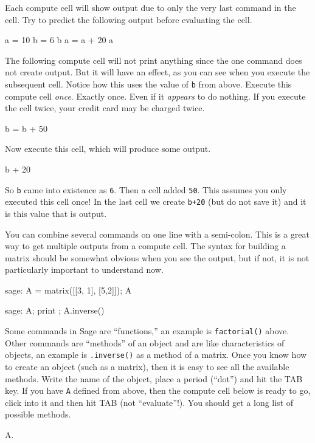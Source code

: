 %
Each compute cell will show output due to only the very last command in the cell.  Try to predict the following output before evaluating the cell.
%
\begin{sageverbatim}
a = 10
b = 6
b
a = a + 20
a
\end{sageverbatim}
%
The following compute cell will not print anything since the one command does not create output.  But it will have an effect, as you can see when you execute the subsequent cell.  Notice how this uses the value of \verb?b? from above.  Execute this compute cell \emph{once}.  Exactly once.  Even if it \emph{appears} to do nothing.  If you execute the cell twice, your credit card may be charged twice.
%
\begin{sageverbatim}
b = b + 50
\end{sageverbatim}
%
Now execute this cell, which will produce some output.
%
\begin{sageverbatim}
b + 20
\end{sageverbatim}
%
So \verb?b? came into existence as \verb?6?.  Then a cell added \verb?50?.  This assumes you only executed this cell once!  In the last cell we create \verb?b+20? (but do not save it) and it is this value that is output.\par
%
You can combine several commands on one line with a semi-colon.  This is a great way to get multiple outputs from a compute cell.  The syntax for building a matrix should be somewhat obvious when you see the output, but if not, it is not particularly important to understand now.
%
\begin{sageverbatim}
sage: A = matrix([[3, 1], [5,2]]); A
\end{sageverbatim}
%
\begin{sageverbatim}
sage: A; print ; A.inverse()
\end{sageverbatim}
%
%
Some commands in Sage are ``functions,'' an example is \verb?factorial()? above.  Other commands are ``methods'' of an object and are like characteristics of objects, an example is \verb?.inverse()? as a method of a matrix.  Once you know how to create an object (such as a matrix), then it is easy to see all the available methods.  Write the name of the object, place a period (``dot'') and hit the TAB key.  If you have \verb?A? defined from above, then the compute cell below is ready to go, click into it and then hit TAB (not ``evaluate''!).  You should get a long list of possible methods.
%
\begin{sageverbatim}
A.
\end{sageverbatim}
